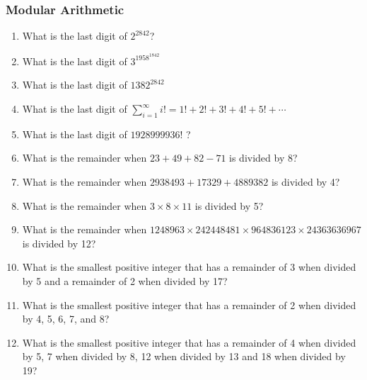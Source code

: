 		\subsubsection{Modular Arithmetic}
			\begin{enumerate}
				\item What is the last digit of $2^{2842}$?
				\item What is the last digit of $3^{1958^{1842}}$
				\item What is the last digit of $1382^{2842}$
				\item What is the last digit of $\sum_{i=1}^\infty i! = 1!+ 2!+3!+4!+5!+\cdots$
				\item What is the last digit of $1928999936!$ ?
				\item What is the remainder when $23+49+82-71$ is divided by 8?
				\item What is the remainder when $2938493 + 17329 + 4889382$ is divided by 4?
				\item What is the remainder when $3\times 8 \times 11$ is divided by 5?
				\item What is the remainder when $1248963 \times 242448481 \times 964836123 \times 24363636967$ is divided by 12?
				\item What is the smallest positive integer that has a remainder of 3 when divided by 5 and a remainder of 2 when divided by 17?
				\item What is the smallest positive integer that has a remainder of 2 when divided by 4, 5, 6, 7, and 8?
				\item What is the smallest positive integer that has a remainder of 4 when divided by 5, 7 when divided by 8, 12 when divided by 13 and 18 when divided by 19?
			\end{enumerate}

